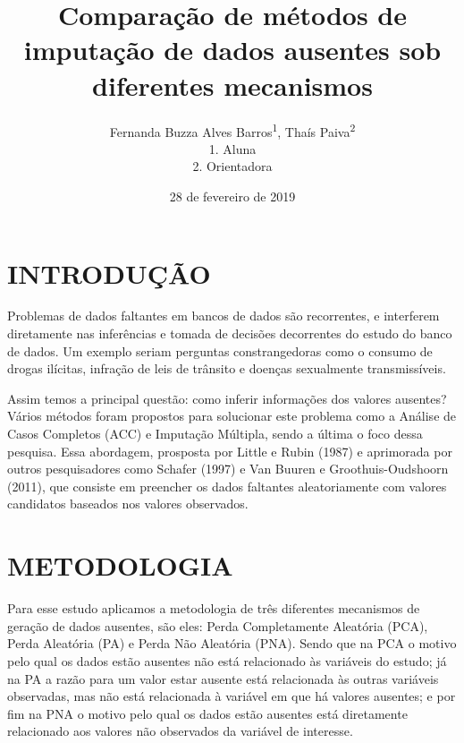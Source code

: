 \documentclass[]{article}
\title{Comparação de métodos de imputação de dados ausentes sob diferentes
mecanismos}
\author{Fernanda Buzza Alves Barros\textsuperscript{1}, Thaís
Paiva\textsuperscript{2}\\
1. Aluna\\
2. Orientadora}
\date{28 de fevereiro de 2019}
\begin{document}
\maketitle

\section{INTRODUÇÃO}\label{introducao}

Problemas de dados faltantes em bancos de dados são recorrentes, e
interferem diretamente nas inferências e tomada de decisões decorrentes
do estudo do banco de dados. Um exemplo seriam perguntas constrangedoras
como o consumo de drogas ilícitas, infração de leis de trânsito e
doenças sexualmente transmissíveis.

Assim temos a principal questão: como inferir informações dos valores
ausentes? Vários métodos foram propostos para solucionar este problema
como a Análise de Casos Completos (ACC) e Imputação Múltipla, sendo a
última o foco dessa pesquisa. Essa abordagem, prosposta por Little e
Rubin (1987) e aprimorada por outros pesquisadores como Schafer (1997) e
Van Buuren e Groothuis-Oudshoorn (2011), que consiste em preencher os
dados faltantes aleatoriamente com valores candidatos baseados nos
valores observados.

\section{METODOLOGIA}\label{metodologia}

Para esse estudo aplicamos a metodologia de três diferentes mecanismos
de geração de dados ausentes, são eles: Perda Completamente Aleatória
(PCA), Perda Aleatória (PA) e Perda Não Aleatória (PNA). Sendo que na
PCA o motivo pelo qual os dados estão ausentes não está relacionado às
variáveis do estudo; já na PA a razão para um valor estar ausente está
relacionada às outras variáveis observadas, mas não está relacionada à
variável em que há valores ausentes; e por fim na PNA o motivo pelo qual
os dados estão ausentes está diretamente relacionado aos valores não
observados da variável de interesse.
\end{document}
